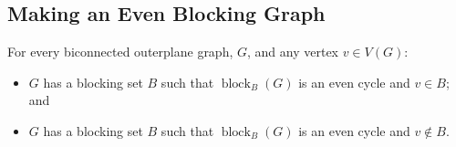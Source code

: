 \documentclass{patmorin}
\DeclareMathOperator{\block}{block}
\begin{document}
\subsection{Making an Even Blocking Graph}

\begin{lem}
  For every biconnected outerplane graph, $G$, and any vertex $v\in V(G)$:
  \begin{itemize}
    \item $G$ has a blocking set $B$ such that $\block_B(G)$ is an even cycle 
       and $v\in B$; and
    \item $G$ has a blocking set $B$ such that $\block_B(G)$ is an even cycle 
       and $v\not\in B$.
  \end{itemize}
\end{lem}
\end{document}
